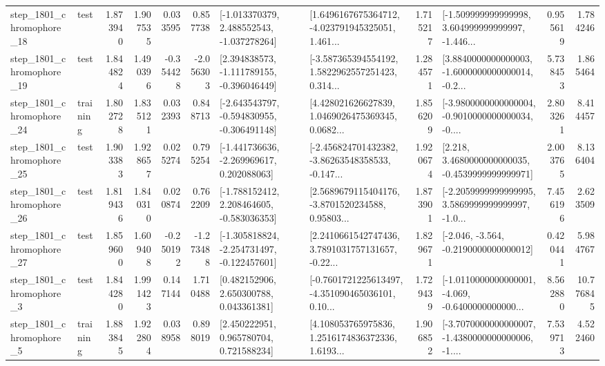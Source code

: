\begin{tabular}{llrrrrllrlrr}
 step\_1801\_chromophore\_18 &      test &      1.873940 &    1.907535 &      0.033595 &  0.857738 &   [-1.013370379, 2.488552543, -1.037278264] &  [1.6496167675364712, -4.023791945325051, 1.461... &       1.715217 &  [-1.509999999999998, 3.604999999999997, -1.446... &            0.955619 &          1.784246 \\
 step\_1801\_chromophore\_19 &      test &      1.844824 &    1.490396 &     -0.354428 & -2.056303 &   [2.394838573, -1.111789155, -0.396046449] &  [-3.587365394554192, 1.5822962557251423, 0.314... &       1.284571 &  [3.8840000000000003, -1.6000000000000014, -0.2... &            5.738453 &          1.865464 \\
 step\_1801\_chromophore\_24 &  training &      1.802728 &    1.835121 &      0.032393 &  0.848713 &  [-2.643543797, -0.594830955, -0.306491148] &  [4.428021626627839, 1.0469026475369345, 0.0682... &       1.856209 &  [-3.9800000000000004, -0.9010000000000034, -0.... &            2.803261 &          8.414457 \\
 step\_1801\_chromophore\_25 &      test &      1.903383 &    1.928657 &      0.025274 &  0.795254 &   [-1.441736636, -2.269969617, 0.202088063] &  [-2.456824701432382, -3.86263548358533, -0.147... &       1.920674 &   [2.218, 3.4680000000000035, -0.4539999999999971] &            2.003765 &          8.136404 \\
 step\_1801\_chromophore\_26 &      test &      1.819436 &    1.840310 &      0.020874 &  0.762209 &   [-1.788152412, 2.208464605, -0.583036353] &  [2.5689679115404176, -3.8701520234588, 0.95803... &       1.873901 &  [-2.2059999999999995, 3.5869999999999997, -1.0... &            7.456196 &          2.623509 \\
 step\_1801\_chromophore\_27 &      test &      1.859600 &    1.609408 &     -0.250192 & -1.273488 &  [-1.305818824, -2.254731497, -0.122457601] &  [2.2410661542747436, 3.7891031757131657, -0.22... &       1.829671 &              [-2.046, -3.564, -0.2190000000000012] &            0.420441 &          5.984767 \\
  step\_1801\_chromophore\_3 &      test &      1.844280 &    1.991423 &      0.147144 &  1.710488 &     [0.482152906, 2.650300788, 0.043361381] &  [-0.7601721225613497, -4.351090465036101, 0.10... &       1.729439 &  [-1.0110000000000001, -4.069, -0.6400000000000... &            8.562880 &         10.776845 \\
  step\_1801\_chromophore\_5 &  training &      1.883845 &    1.922804 &      0.038958 &  0.898019 &     [2.450222951, 0.965780704, 0.721588234] &  [4.108053765975836, 1.2516174836372336, 1.6193... &       1.906852 &  [-3.7070000000000007, -1.4380000000000006, -1.... &            7.539713 &          4.522460 \\

\end{tabular}
